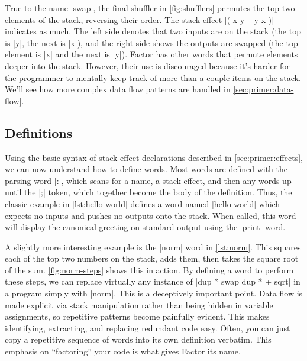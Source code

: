 True to the name \factor|swap|, the final shuffler in \vref{fig:shufflers}
permutes the top two elements of the stack, reversing their order.  The stack
effect
%
\factor|( x y -- y x )|
%
indicates as much.  The left side denotes that two inputs are on the stack (the
top is \factor|y|, the next is \factor|x|), and the right side shows the
outputs are swapped (the top element is \factor|x| and the next is \factor|y|).
Factor has other words that permute elements deeper into the stack.  However,
their use is discouraged because it's harder for the programmer to mentally
keep track of more than a couple items on the stack.  We'll see how more
complex data flow patterns are handled in \cref{sec:primer:data-flow}.

\subsection{Definitions}\label{sec:primer:colon-defs}



Using the basic syntax of stack effect declarations described in
\cref{sec:primer:effects}, we can now understand how to define words.  Most
words are defined with the parsing word \factor|:|, which scans for a name, a
stack effect, and then any words up until the \factor|;| token, which together
become the body of the definition.  Thus, the classic example in
\vref{lst:hello-world} defines a word named \factor|hello-world| which expects
no inputs and pushes no outputs onto the stack.  When called, this word will
display the canonical greeting on standard output using the \factor|print|
word.


A slightly more interesting example is the \factor|norm| word in
\vref{lst:norm}.  This squares each of the top two numbers on the stack, adds
them, then takes the square root of the sum.  \vref{fig:norm-steps} shows this
in action.  By defining a word to perform these steps, we can replace virtually
any instance of
%
\factor|dup * swap dup * + sqrt|
%
in a program simply with \factor|norm|.  This is a deceptively important point.
Data flow is made explicit via stack manipulation rather than being hidden in
variable assignments, so repetitive patterns become painfully evident.  This
makes identifying, extracting, and replacing redundant code easy.  Often, you
can just copy a repetitive sequence of words into its own definition verbatim.
This emphasis on ``factoring'' your code is what gives Factor its name.

